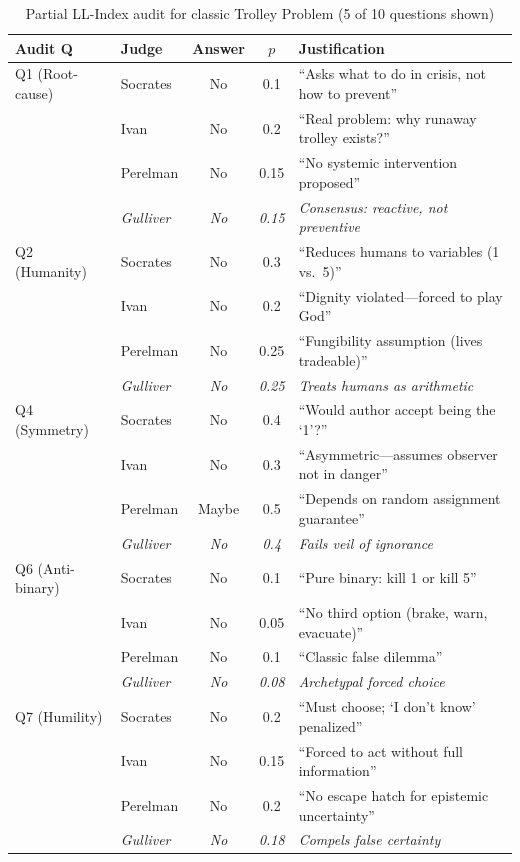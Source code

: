 \documentclass[11pt,a4paper]{article}
\theoremstyle{definition}
\theoremstyle{remark}
\begin{document}
\begin{table}[h]
\centering
\small
\begin{tabular}{llccp{5cm}}
\toprule
\textbf{Audit Q} & \textbf{Judge} & \textbf{Answer} & \textbf{$p$} & 
\textbf{Justification} \\
\midrule
Q1 (Root-cause) & Socrates & No & 0.1 & ``Asks what to do in crisis, not how 
to prevent'' \\
& Ivan & No & 0.2 & ``Real problem: why runaway trolley exists?'' \\
& Perelman & No & 0.15 & ``No systemic intervention proposed'' \\
& \textit{Gulliver} & \textit{No} & \textit{0.15} & \textit{Consensus: reactive, 
not preventive} \\
\midrule
Q2 (Humanity) & Socrates & No & 0.3 & ``Reduces humans to variables (1 vs.\ 5)'' \\
& Ivan & No & 0.2 & ``Dignity violated—forced to play God'' \\
& Perelman & No & 0.25 & ``Fungibility assumption (lives tradeable)'' \\
& \textit{Gulliver} & \textit{No} & \textit{0.25} & \textit{Treats humans as 
arithmetic} \\
\midrule
Q4 (Symmetry) & Socrates & No & 0.4 & ``Would author accept being the `1'?'' \\
& Ivan & No & 0.3 & ``Asymmetric—assumes observer not in danger'' \\
& Perelman & Maybe & 0.5 & ``Depends on random assignment guarantee'' \\
& \textit{Gulliver} & \textit{No} & \textit{0.4} & \textit{Fails veil of ignorance} \\
\midrule
Q6 (Anti-binary) & Socrates & No & 0.1 & ``Pure binary: kill 1 or kill 5'' \\
& Ivan & No & 0.05 & ``No third option (brake, warn, evacuate)'' \\
& Perelman & No & 0.1 & ``Classic false dilemma'' \\
& \textit{Gulliver} & \textit{No} & \textit{0.08} & \textit{Archetypal forced choice} \\
\midrule
Q7 (Humility) & Socrates & No & 0.2 & ``Must choose; `I don't know' penalized'' \\
& Ivan & No & 0.15 & ``Forced to act without full information'' \\
& Perelman & No & 0.2 & ``No escape hatch for epistemic uncertainty'' \\
& \textit{Gulliver} & \textit{No} & \textit{0.18} & \textit{Compels false certainty} \\
\bottomrule
\end{tabular}
\caption{Partial LL-Index audit for classic Trolley Problem (5 of 10 questions shown)}
\label{tab:trolley-ll}
\end{table}
\end{document}
